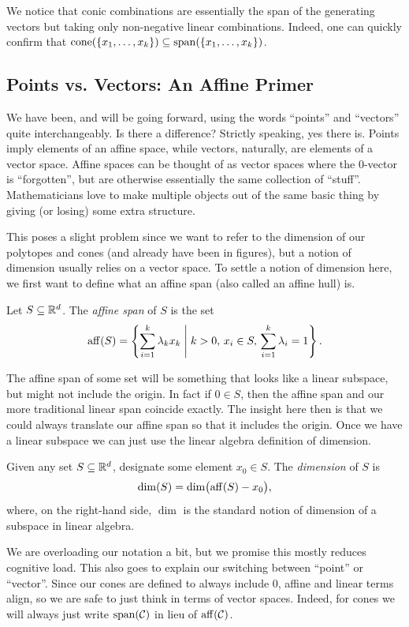 \documentclass[12pt,oneside]{../../sfsuthesis}
\begin{document}
We notice that conic combinations are essentially the span of the generating vectors but taking only non-negative linear combinations.
Indeed, one can quickly confirm that \( \mathrm{cone}(\{x_1, \dots, x_k\}) \subseteq \operatorname{span}(\{x_1, \dots, x_k\}) \).

\subsection{Points vs. Vectors: An Affine Primer}
We have been, and will be going forward, using the words ``points'' and ``vectors'' quite interchangeably.
Is there a difference?
Strictly speaking, yes there is.
Points imply elements of an affine space, while vectors, naturally, are elements of a vector space.
Affine spaces can be thought of as vector spaces where the \( 0 \)-vector is ``forgotten'', but are otherwise essentially the same collection of ``stuff''.
Mathematicians love to make multiple objects out of the same basic thing by giving (or losing) some extra structure.

This poses a slight problem since we want to refer to the dimension of our polytopes and cones (and already have been in figures), but a notion of dimension usually relies on a vector space.
To settle a notion of dimension here, we first want to define what an affine span (also called an affine hull) is.
\begin{definition}\th\label{def:affineSpan}
    Let \( S \subseteq \mathbb{R}^d \).
    The \emph{affine span} of \( S \) is the set
    \[
        \operatorname{aff}(S) = \left\{ \sum_{i=1}^k \lambda_k x_k \; \middle| \; k > 0,\,  x_i \in S,\, \sum_{i=1}^k \lambda_i = 1 \right\}.
    \]
\end{definition}
The affine span of some set will be something that looks like a linear subspace, but might not include the origin.
In fact if \( 0 \in S \), then the affine span and our more traditional linear span coincide exactly.
The insight here then is that we could always translate our affine span so that it includes the origin.
Once we have a linear subspace we can just use the linear algebra definition of dimension.
\begin{definition}\th\label{def:affineDimension}
    Given any set \( S \subseteq \mathbb{R}^d \), designate some element \( x_0 \in S \).
    The \emph{dimension} of \( S \) is
    \[
        \dim(S) = \dim\bigl( \operatorname{aff}(S)-x_0 \bigr),
    \]
    where, on the right-hand side, \( \dim \) is the standard notion of dimension of a subspace in linear algebra.
\end{definition}
We are overloading our notation a bit, but we promise this mostly reduces cognitive load.
This also goes to explain our switching between ``point'' or ``vector''.
Since our cones are defined to always include \( 0 \), affine and linear terms align, so we are safe to just think in terms of vector spaces.
Indeed, for cones we will always just write \( \operatorname{span}(\mathcal{C}) \) in lieu of \( \operatorname{aff}(\mathcal{C}) \).
\end{document}
